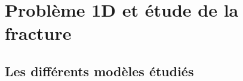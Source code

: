 
\chapter{Problème 1D et étude de la fracture} %

\label{Chapter4} %










\section{Les différents modèles étudiés}











